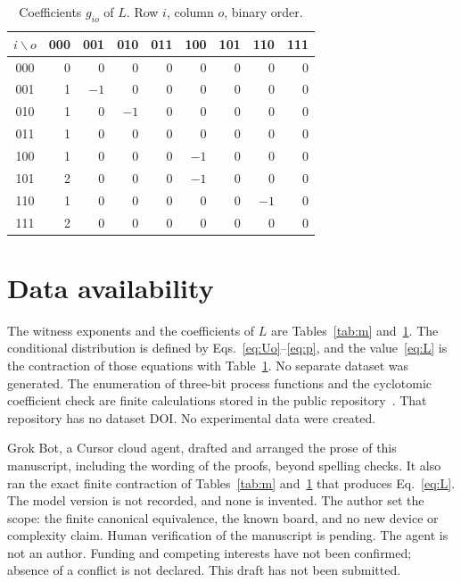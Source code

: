 \documentclass[aps,pra,reprint,amsmath,amssymb,nofootinbib]{revtex4-2}
\begin{document}
\begin{table}[t]
\caption{Coefficients \(g_{io}\) of \(L\). Row \(i\), column \(o\), binary order.}
\label{tab:g}
\begin{ruledtabular}
\begin{tabular}{c rrrrrrrr}
\(i\backslash o\) & 000 & 001 & 010 & 011 & 100 & 101 & 110 & 111\\
\hline
000 & 0 & 0 & 0 & 0 & 0 & 0 & 0 & 0\\
001 & 1 & $-1$ & 0 & 0 & 0 & 0 & 0 & 0\\
010 & 1 & 0 & $-1$ & 0 & 0 & 0 & 0 & 0\\
011 & 1 & 0 & 0 & 0 & 0 & 0 & 0 & 0\\
100 & 1 & 0 & 0 & 0 & $-1$ & 0 & 0 & 0\\
101 & 2 & 0 & 0 & 0 & $-1$ & 0 & 0 & 0\\
110 & 1 & 0 & 0 & 0 & 0 & 0 & $-1$ & 0\\
111 & 2 & 0 & 0 & 0 & 0 & 0 & 0 & 0\\
\end{tabular}
\end{ruledtabular}
\end{table}

\section*{Data availability}
The witness exponents and the coefficients of \(L\) are Tables~\ref{tab:m} and~\ref{tab:g}. The conditional distribution is defined by Eqs.~\eqref{eq:Uo}--\eqref{eq:p}, and the value~\eqref{eq:L} is the contraction of those equations with Table~\ref{tab:g}. No separate dataset was generated. The enumeration of three-bit process functions and the cyclotomic coefficient check are finite calculations stored in the public repository~\cite{archive}. That repository has no dataset DOI. No experimental data were created.

\begin{acknowledgments}
Grok Bot, a Cursor cloud agent, drafted and arranged the prose of this manuscript, including the wording of the proofs, beyond spelling checks. It also ran the exact finite contraction of Tables~\ref{tab:m} and~\ref{tab:g} that produces Eq.~\eqref{eq:L}. The model version is not recorded, and none is invented. The author set the scope: the finite canonical equivalence, the known board, and no new device or complexity claim. Human verification of the manuscript is pending. The agent is not an author. Funding and competing interests have not been confirmed; absence of a conflict is not declared. This draft has not been submitted.
\end{acknowledgments}



\end{document}
